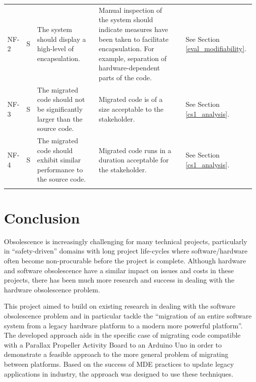 \documentclass{UoYCSproject}
\renewcommand{\checkmark}{\ding{51}}
\begin{document}
\begin{landscape}
\begin{longtable}{@{}p{}p{}p{}p{}p{}p{}@{}}
  NF-2 & S & The system should display a high-level of encapsulation. & Manual inspection of the system should indicate measures have been taken to facilitate encapsulation. For example, separation of hardware-dependent parts of the code. & \checkmark & See Section \ref{eval_modifiability}. \\
  NF-3 & S & The migrated code should not be significantly larger than the source code. & Migrated code is of a size acceptable to the stakeholder. & \checkmark & See Section \ref{cs1_analysis}. \\
  NF-4 & S & The migrated code should exhibit similar performance to the source code. & Migrated code runs in a duration acceptable for the stakeholder. & \checkmark & See Section \ref{cs1_analysis}. \\
    \bottomrule
\label{table:case_study_func_test_results}
  \end{longtable}
\end{landscape}

\restoregeometry

\chapter{Conclusion} \label{conc}
Obsolescence is increasingly challenging for many technical projects, particularly in ``safety-driven'' domains with long project life-cycles where software/hardware often become non-procurable before the project is complete. Although hardware and software obsolescence have a similar impact on issues and costs in these projects, there has been much more research and success in dealing with the hardware obsolescence problem.

This project aimed to build on existing research in dealing with the software obsolescence problem and in particular tackle the ``migration of an entire software system from a legacy hardware platform to a modern more powerful platform''. The developed approach aids in the specific case of migrating code compatible with a Parallax Propeller Activity Board to an Arduino Uno in order to demonstrate a feasible approach to the more general problem of migrating between platforms. Based on the success of MDE practices to update legacy applications in industry, the approach was designed to use these techniques.
\end{document}
